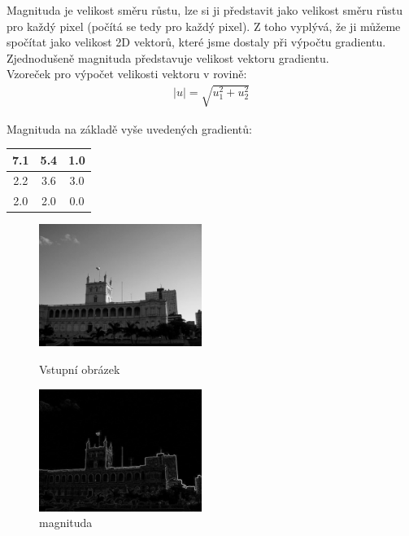 \documentclass{report}
\begin{document}
Magnituda je velikost směru růstu, lze si ji představit jako velikost směru růstu pro každý pixel (počítá se tedy pro každý pixel).  Z toho vyplývá, že ji můžeme spočítat jako velikost 2D vektorů, které jsme dostaly při výpočtu gradientu. Zjednodušeně magnituda představuje velikost vektoru gradientu. \\

Vzoreček pro výpočet velikosti vektoru v rovině:
\begin{align}
   \label{velikost_vektoru} |u| = \sqrt{u_1^2 + u_2^2}
\end{align}

Magnituda na základě vyše uvedených gradientů:
\begin{center}
  \begin{tabular}{ | c | c | c | }
    \hline
    7.1 & 5.4 & 1.0 \\ \hline
    2.2 & 3.6 & 3.0 \\ \hline
    2.0 & 2.0 & 0.0 \\
    \hline
  \end{tabular}
\end{center}

\begin{figure}[H]
	\centering
	\begin{minipage}[c]{150pt}
		\centering
		\includegraphics[width=150pt]{./img/vstupni_obraz.jpg}
		\caption{Vstupní obrázek}
	\end{minipage}
	\begin{minipage}[c]{150pt}
		\includegraphics[width=150pt]{./img/magnitude.jpg}
		\caption{magnituda}
		\centering
	\end{minipage}
\end{figure}
\end{document}

